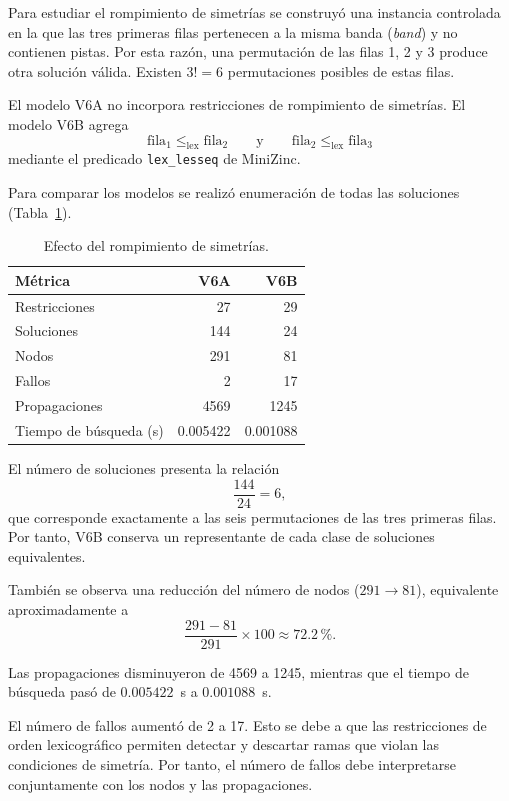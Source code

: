\documentclass[12pt]{article}
\begin{document}
Para estudiar el rompimiento de simetrías se construyó una instancia controlada en la que las tres primeras filas pertenecen a la misma banda (\emph{band}) y no contienen pistas. Por esta razón, una permutación de las filas 1, 2 y 3 produce otra solución válida. Existen $3!=6$ permutaciones posibles de estas filas.

El modelo V6A no incorpora restricciones de rompimiento de simetrías. El modelo V6B agrega
\[
\text{fila}_1 \leq_{\mathrm{lex}} \text{fila}_2
\qquad\text{y}\qquad
\text{fila}_2 \leq_{\mathrm{lex}} \text{fila}_3
\]
mediante el predicado \texttt{lex\_lesseq} de MiniZinc.

Para comparar los modelos se realizó enumeración de todas las soluciones (Tabla~\ref{tab:sudoku-simetria}).

\begin{table}[H]
\centering
\caption{Efecto del rompimiento de simetrías.}
\label{tab:sudoku-simetria}
\begin{tabular}{lrr}
\hline
Métrica & V6A & V6B\\
\hline
Restricciones          & 27       & 29\\
Soluciones             & 144      & 24\\
Nodos                  & 291      & 81\\
Fallos                 & 2        & 17\\
Propagaciones          & 4569     & 1245\\
Tiempo de búsqueda (s) & 0.005422 & 0.001088\\
\hline
\end{tabular}
\end{table}

El número de soluciones presenta la relación
\[
\frac{144}{24}=6,
\]
que corresponde exactamente a las seis permutaciones de las tres primeras filas. Por tanto, V6B conserva un representante de cada clase de soluciones equivalentes.

También se observa una reducción del número de nodos ($291\rightarrow 81$), equivalente aproximadamente a
\[
\frac{291-81}{291}\times 100\approx 72.2\,\%.
\]

Las propagaciones disminuyeron de 4569 a 1245, mientras que el tiempo de búsqueda pasó de $0.005422$~s a $0.001088$~s.

El número de fallos aumentó de 2 a 17. Esto se debe a que las restricciones de orden lexicográfico permiten detectar y descartar ramas que violan las condiciones de simetría. Por tanto, el número de fallos debe interpretarse conjuntamente con los nodos y las propagaciones.
\end{document}
